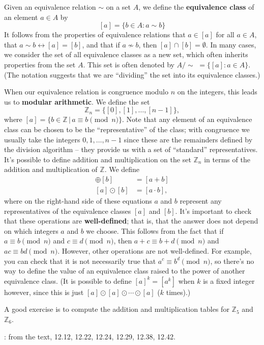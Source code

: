 \documentclass[letterpaper,12pt]{article}
\newcommand{\Z}{\mathbb{Z}}
\begin{document}
Given an equivalence relation $\sim$ on a set $A$, we define the {\bf equivalence class} of an element $a\in A$ by
\[
 [a] = \{b\in A : a\sim b\}
\]
It follows from the properties of equivalence relations that $a\in [a]$ for all $a\in A$, that $a\sim b \leftrightarrow [a]=[b]$, and that if $a\not\sim b$, then $[a]\cap [b] =\emptyset$. In many cases, we consider the set of all equivalence classes as a new set, which often inherits properties from the set $A$. This set is often denoted by $A/\!\sim\,\, = \{[a] : a\in A\}$. (The notation suggests that we are ``dividing'' the set into its equivalence classes.)

When our equivalence relation is congruence modulo $n$ on the integers, this leads us to {\bf modular arithmetic}. We define the set
\[
 \Z_n = \{[0],[1],\ldots, [n-1]\},
\]
where $[a] = \{b\in \Z \,|\, a\equiv b \pmod{n}\}$. Note that any element of an equivalence class can be chosen to be the ``representative'' of the class; with congruence we usually take the integers $0,1,\ldots, n-1$ since these are the remainders defined by the division algorithm -- they provide us with a set of ``standard'' representatives. It's possible to define addition and multiplication on the set $\Z_n$ in terms of the addition and multiplication of $\Z$. We define
\begin{align*}
 [a]\oplus [b] & = [a+b]\\
 [a]\odot [b] & = [a\cdot b],
\end{align*}
where on the right-hand side of these equations $a$ and $b$ represent any representatives of the equivalence classes $[a]$ and $[b]$. It's important to check that these operations are {\bf well-defined}; that is, that the answer does not depend on which integers $a$ and $b$ we choose. This follows from the fact that if $a\equiv b\pmod{n}$ and $c\equiv d\pmod{n}$, then $a+c \equiv b+d\pmod{n}$ and $ac\equiv bd\pmod{n}$. However, other operations are not well-defined. For example, you can check that it is not necessarily true that $a^c\equiv b^d\pmod{n}$, so there's no way to define the value of an equivalence class raised to the power of another equivalence class. (It is possible to define $[a]^k = [a^k]$ when $k$ is a fixed integer however, since this is just $[a]\odot [a]\odot\cdots\odot [a]$ ($k$ times).)

A good exercise is to compute the addition and multiplication tables for $\Z_5$ and $\Z_6$.

: from the text, 12.12, 12.22, 12.24, 12.29, 12.38, 12.42.
\end{document}
